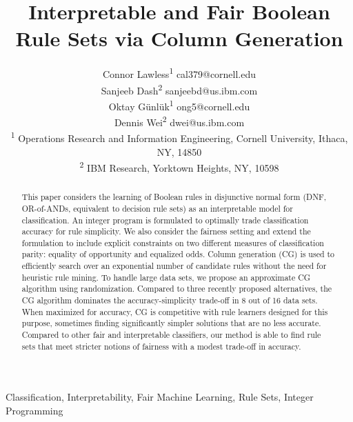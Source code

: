 \documentclass[twoside,11pt]{article}
\begin{document}
\title{Interpretable and Fair Boolean Rule Sets via Column Generation}

\author{\name Connor Lawless\textsuperscript{1} \email cal379@cornell.edu \\
       \AND
       \name Sanjeeb Dash\textsuperscript{2} \email sanjeebd@us.ibm.com \\
       \AND
       \name Oktay  G\"unl\"uk\textsuperscript{1} \email ong5@cornell.edu \\
       \AND
       \name Dennis Wei\textsuperscript{2} \email dwei@us.ibm.com \\
       \addr \textsuperscript{1} Operations Research and Information Engineering, Cornell University, Ithaca, NY, 14850   \\
       \addr \textsuperscript{2} IBM Research, Yorktown Heights, NY, 10598
       }
       

\maketitle


\begin{abstract}%
This paper considers the learning of Boolean rules in disjunctive normal form (DNF, OR-of-ANDs, equivalent to decision rule sets) as an interpretable model for classification.  An integer program is formulated to optimally trade classification accuracy for rule simplicity. We also consider the fairness setting and extend the formulation to include explicit constraints on two different measures of classification parity: equality of opportunity and equalized odds. Column generation (CG) is used to efficiently search over an exponential number of candidate rules without the need for heuristic rule mining. To handle large data sets, we propose an approximate CG algorithm using randomization.  Compared to three recently proposed alternatives, the CG algorithm dominates the accuracy-simplicity trade-off in 8 out of 16 data sets. When maximized for accuracy, CG is competitive with rule learners designed for this purpose, sometimes finding significantly simpler solutions that are no less accurate. Compared to other fair and interpretable classifiers, our method is able to find rule sets that meet stricter notions of fairness with a modest trade-off in accuracy.
\end{abstract}

\begin{keywords}
  Classification, Interpretability, Fair Machine Learning, Rule Sets, Integer Programming
\end{keywords}
\end{document}
